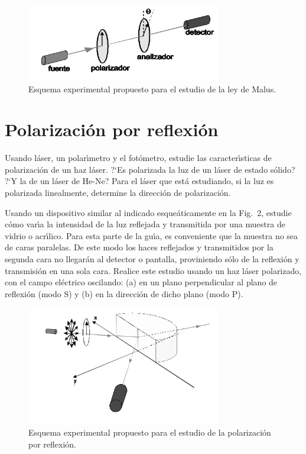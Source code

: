 \documentclass[laboratorio]{guia}
\begin{document}
\begin{figure}[t!]
    \centering
    \includegraphics[width=8.5cm]{LG12--000.png}
    \caption{Esquema experimental propuesto para el estudio de la ley de Malus.}
    \label{fig:1}
\end{figure}

\section{Polarizaci\'on por reflexi\'on}

Usando l\'aser, un polar\'\i metro y el fot\'ometro, estudie las 
caracter\'\i sticas de polarizaci\'on de un haz l\'aser. ?`Es polarizada la
luz de un l\'aser de estado s\'olido? ?`Y la de un l\'aser de He-Ne? Para el
l\'aser que est\'a estudiando, si la luz es polarizada linealmente, determine
la direcci\'on de polarizaci\'on.

Usando un dispositivo similar al indicado esque\'aticamente en la Fig.~2, 
estudie c\'omo var\'\i a la intensidad de la luz reflejada y transmitida por 
una muestra de vidrio o acr\'\i lico. Para esta parte de la gu\'\i a, es 
conveniente que la muestra no sea de caras paralelas. De este modo los haces
reflejados y transmitidos por la segunda cara no llegar\'an al detector o
pantalla, proviniendo s\'olo de la reflexi\'on y transmisi\'on en una sola 
cara. Realice este estudio usando un haz l\'aser polarizado, con el campo
el\'ectrico oscilando: (a) en un plano perpendicular al plano de reflexi\'on 
(modo S) y (b) en la direcci\'on de dicho plano (modo P).

\begin{figure}[t!]
    \centering
    \includegraphics[width=8.5cm]{LG12--001.png}
    \caption{Esquema experimental propuesto para el estudio de la polarizaci\'on
    por reflexi\'on.}
    \label{fig:1}
\end{figure}
\end{document}
